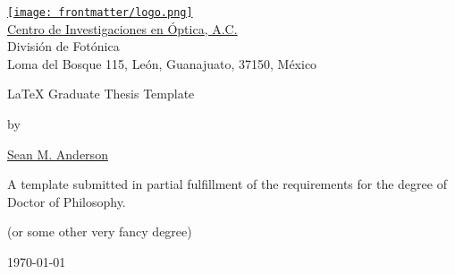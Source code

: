 \begin{titlepage}
\begin{center}
   {\href{http://www.cio.mx}{\texttt{[image: frontmatter/logo.png]}}
   {\\
{{\href{http://www.cio.mx}{{{\Large Centro de Investigaciones en \'Optica}}, A.C.}}}\\   
    \vspace{.1cm}
 {\Large{Divisi\'on de Fot\'onica\\
\vspace{.1cm}
{{\small Loma del Bosque 115, Le\'on, Guanajuato, 37150, M\'exico}}
   }}}}
\vspace{2cm}

{\ttfamily
{\Huge \LaTeX{} Graduate Thesis Template}
\vspace{0.5cm}

{\large{by}}
\vspace{0.5cm}

{\LARGE \href{http://www.roguephysicist.org}{Sean M. Anderson}}
\vspace{0.5cm}
}

{\large A template submitted in partial fulfillment of the requirements for the degree of Doctor of Philosophy.

(or some other very fancy degree)}

\vspace{2cm}

{\large{}}
\vfill
\today
\end{center}
\end{titlepage}

